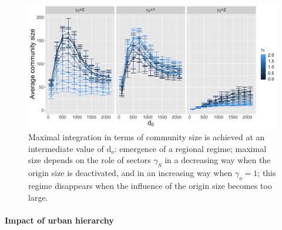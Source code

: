 \documentclass[10pt,letterpaper]{article}
\begin{document}
\begin{figure}
    \includegraphics[width=\textwidth]{figures/Fig6.png}
    \vspace{2cm}
	\caption{Maximal integration in terms of community size is achieved at an intermediate value of d$_o$: emergence of a regional regime; maximal size depends on the role of sectors $\gamma_S$ in a decreasing way when the origin size is deactivated, and in an increasing way when $\gamma_o=1$; this regime disappears when the influence of the origin size becomes too large.\label{fig:fig6}}
\end{figure}


\paragraph{Impact of urban hierarchy}
\end{document}
